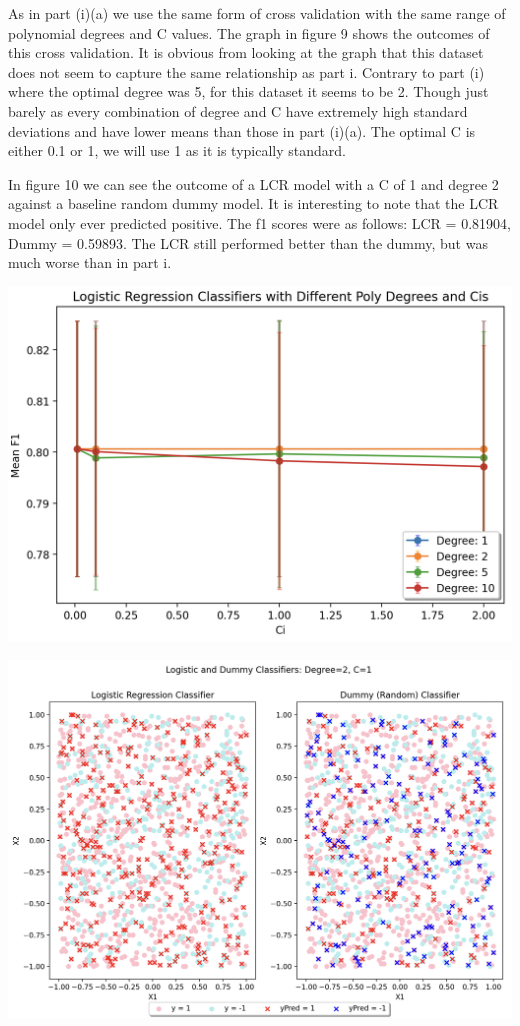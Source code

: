 \documentclass{article}
\begin{document}
As in part (i)(a) we use the same form of cross validation with the same range of polynomial degrees and C values. The graph in figure 9 shows the outcomes of this cross validation. It is obvious from looking at the graph that this dataset does not seem to capture the same relationship as part i. Contrary to part (i) where the optimal degree was 5, for this dataset it seems to be 2. Though just barely as every combination of degree and C have extremely high standard deviations and have lower means than those in part (i)(a). The optimal C is either 0.1 or 1, we will use 1 as it is typically standard.

In figure 10 we can see the outcome of a LCR model with a C of 1 and degree 2 against a baseline random dummy model. It is interesting to note that the LCR model only ever predicted positive. The f1 scores were as follows: LCR = 0.81904, Dummy = 0.59893. The LCR still performed better than the dummy, but was much worse than in part i.

\begin{center}
\includegraphics[width=.8\linewidth]{iia.png}
\end{center}

\begin{center}
\includegraphics[width=.8\linewidth]{logreg2.png}
\end{center}
\end{document}
